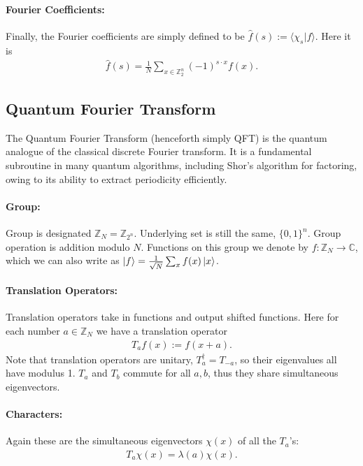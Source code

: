 \paragraph{Fourier Coefficients:} Finally, the Fourier coefficients are simply defined to be $\hat{f}(s) := \langle \chi_s|f\rangle$. Here it is 
\begin{align*}
    \hat{f}(s) = \frac{1}{N} \sum_{x \in \mathbb{Z}_2^n} (-1)^{s \cdot x} f(x).
\end{align*}

\subsection{Quantum Fourier Transform}
The Quantum Fourier Transform (henceforth simply QFT) is the quantum analogue of the classical discrete Fourier transform. It is a fundamental subroutine in many quantum algorithms, including Shor's algorithm for factoring, owing to its ability to extract periodicity efficiently.

\paragraph{Group:} Group is designated $\mathbb{Z}_N= \mathbb{Z}_{2^n}$. Underlying set is still the same, $\{0,1\}^n$. Group operation is addition modulo $N$. Functions on this group we denote by $f: \mathbb{Z}_N \to \mathbb{C}$, which we can also write as $\ket{f} = \frac{1}{\sqrt{N}} \sum_x f(x)\ket{x}$.

\paragraph{Translation Operators:} Translation operators take in functions and output shifted functions. Here for each number $a \in \mathbb{Z}_N$ we have a translation operator
\begin{align*}
    T_af(x) := f(x+a).
\end{align*}
Note that translation operators are unitary, $T_a^\dag = T_{-a}$, so their eigenvalues all have modulus 1. $T_a$ and $T_b$ commute for all $a,b$, thus they share simultaneous eigenvectors.

\paragraph{Characters:} Again these are the simultaneous eigenvectors ${\chi(x)}$ of all the $T_a$'s:
\begin{align*}
    T_a\chi(x) = \lambda(a)\chi(x).
\end{align*}

